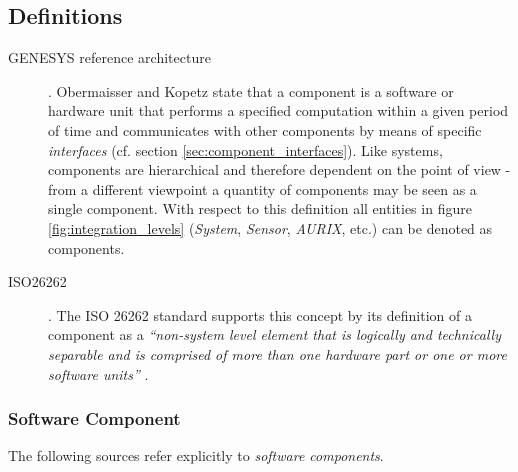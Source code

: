 \subsection{Definitions}

\begin{description}
	\item [GENESYS reference architecture] .
	Obermaisser and Kopetz state that a component is a software or hardware unit that performs a specified computation within a given period of time \cite[p.38]{genesys} and communicates with other components by means of specific \emph{interfaces} (cf. section \ref{sec:component_interfaces}). Like systems, components are hierarchical and therefore dependent on the point of view - from a different viewpoint a quantity of components may be seen as a single component. With respect to this definition all entities in figure \ref{fig:integration_levels} (\emph{System}, \emph{Sensor}, \emph{AURIX}, etc.) can be denoted as components.

	\item [ISO26262] .
	The ISO 26262 standard supports this concept by its definition of a component as a \emph{``non-system level element that is logically and technically separable and is comprised of more than one hardware part or one or more software units''} \cite{iso26262:1}.
\end{description}


\subsubsection{Software Component}
The following sources refer explicitly to \emph{software components}.

